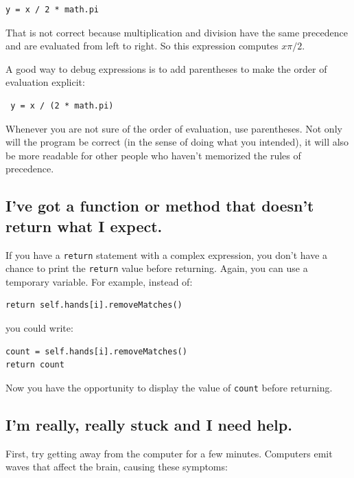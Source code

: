\documentclass[10pt]{book}
\begin{document}
\beforeverb
\begin{verbatim}
y = x / 2 * math.pi
\end{verbatim}
\afterverb
%
That is not correct because multiplication and division have
the same precedence and are evaluated from left to right.
So this expression computes $x \pi / 2$.

A good way to debug expressions is to add parentheses to make
the order of evaluation explicit:

\beforeverb
\begin{verbatim}
 y = x / (2 * math.pi)
\end{verbatim}
\afterverb
%
Whenever you are not sure of the order of evaluation, use
parentheses.  Not only will the program be correct (in the sense
of doing what you intended), it will also be more readable for
other people who haven't memorized the rules of precedence.


\subsection{I've got a function or method that doesn't return what I
expect.}

If you have a {\tt return} statement with a complex expression,
you don't have a chance to print the {\tt return} value before
returning.  Again, you can use a temporary variable.  For
example, instead of:

\beforeverb
\begin{verbatim}
return self.hands[i].removeMatches()
\end{verbatim}
\afterverb
%
you could write:

\beforeverb
\begin{verbatim}
count = self.hands[i].removeMatches()
return count
\end{verbatim}
\afterverb
%
Now you have the opportunity to display the value of
{\tt count} before returning.


\subsection{I'm really, really stuck and I need help.}

First, try getting away from the computer for a few minutes.
Computers emit waves that affect the brain, causing these
symptoms:
\end{document}
